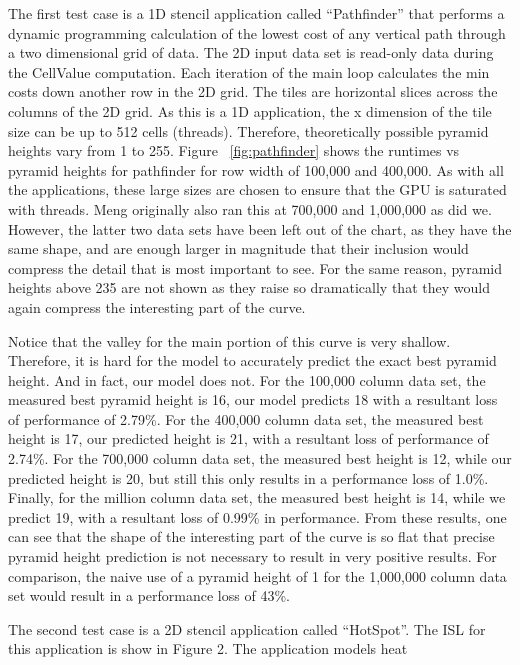 \documentclass{styles/sig-alternate}
\begin{document}
\begin{enumerate*}
\item The first test case is a 1D stencil application called ``Pathfinder'' that performs a dynamic programming calculation 
of the lowest cost of any vertical path through a two dimensional grid of data.  
The 2D input data set is read-only data during the CellValue computation.  
Each iteration of the main loop calculates the min costs down another row in the 2D grid.
The tiles are horizontal slices across the columns of the 2D grid.  As this is a 1D application,
the x dimension of the tile size can be up to 512 cells (threads).  Therefore, theoretically possible
pyramid heights vary from 1 to 255.  Figure ~\ref{fig:pathfinder} shows the runtimes vs pyramid heights for pathfinder for
row width of 100,000 and 400,000.  As with all the applications, these large sizes are chosen to ensure
that the GPU is saturated with threads.  Meng originally also ran this at 700,000 and 1,000,000 as did we.
However, the latter two data sets have been left out of the chart, as they have the same shape, and are enough
larger in magnitude that their inclusion would compress the detail that is most important to see.  For the same
reason, pyramid heights above 235 are not shown as they raise so dramatically that they would again compress
the interesting part of the curve.  


Notice that the valley for the main portion of this curve is very shallow.  Therefore, it 
is hard for the model to accurately predict the exact best pyramid height.  And in fact, our model does not.  For the 100,000 column data set,
the measured best pyramid height is 16, our model predicts 18 with a resultant loss of performance of 2.79\%.  For the 400,000 column data set,
the measured best height is 17, our predicted height is 21, with a resultant loss of performance of 2.74\%.  For the 700,000 column data set,
the measured best height is 12, while our predicted height is 20, but still this only results in a performance loss of 1.0\%.  Finally, for the
million column data set, the measured best height is 14, while we predict 19, with a resultant loss of 0.99\% in performance.  From these results, one
can see that the shape of the interesting part of the curve is so flat that precise pyramid height prediction is not necessary to result in very positive results.
For comparison, the naive use of a pyramid height of 1 for the 1,000,000 column data set would result in a performance loss of 43\%.
\item The second test case is a 2D stencil application called ``HotSpot''.  The ISL for this application is show in Figure 2.  
The application models heat 
\end{enumerate*}
\end{document}
